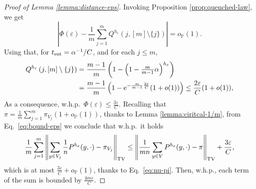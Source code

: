\documentclass[11pt,oneside]{amsart}
\numberwithin{equation}{section}  %
\theoremstyle{plain}
\newcommand{\whp}{{w.h.p.~}}
\newcommand{\eps}{\varepsilon}
\newcommand{\p}{\mathbb{P}}
\newcommand{\op}{o_{\p}}
\newcommand{\tv}[1]{\left\|#1\right\|_{\rm TV}}
\newcommand{\tent}{t_{\textup{ent}}}
\newcommand{\semi}{{Q}}
\newcommand{\h}{{h_\eps}}
\begin{document}
\begin{proof}[Proof of Lemma \ref{lemma:distance-eps}]
	Invoking Proposition \ref{prop:quenched-law}, we get $$\left|\Phi(\eps)-\frac1m\sum_{j=1}^m\semi^\h(j, [m]\setminus \{j\})\right|=\op(1).$$ Using that, for $\tent=\alpha^{-1}/C$, and for each $j \le m$,
	\begin{equation} \label{eq:Q}
		\begin{split}
			 \semi^\h\left(j,[m]\setminus\{j\}\right)
             &=\frac{m-1}{m}\left(1-\left(1-\tfrac m{m-1}\alpha\right)^\h\right)\\
             &= \frac{m-1}{m}\left(1- {\rm e}^{-\frac{m}{m-1}\frac{2\eps}{C}}(1+o(1))\right) \le \frac{2\eps}{C}(1+o(1)),
		\end{split}
	\end{equation}
    As a consequence, \whp $\Phi(\eps) \le \frac{3\eps}{C}$.
	Recalling that $\pi=\frac{1}{m}\sum_{j=1}^m\pi_{V_j}(1+\op(1))$, thanks to Lemma \ref{lemma:ciritcal-1/m}, from Eq.~\eqref{eq:bound-eps} we conclude that \whp it holds 
	\begin{equation}
		\begin{split} 
			\frac1m\sum_{j=1}^m \tv {  \sum_{y \in V_j}\frac1n P^{\h}(y,\cdot )-{\pi}_{V_j} } \le \tv { \frac{1}{mn}\sum_{y \in V}P^{\h}(y,\cdot)-\pi} +\frac{3\eps}{C},
		\end{split}
	\end{equation}
	which is at most $\frac{3\eps}{C}+\op(1)$, thanks to Eq.~\eqref{eq:nu-pi}. Then, w.h.p., each term of the sum is bounded by $\frac{4m\eps}{C}$.
\end{proof}
\end{document}
